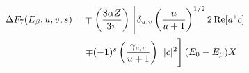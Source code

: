 %
%
%
\begin{align}
\Delta F_7(E_{\beta}, u, v, s) = &
\mp \left( \frac{8 \alpha Z}{3\pi } \right) \left[ \delta_{u,v} \left( \frac{u}{u+1} \right)^{1/2} 2\,\mathrm{Re}\! \,[a^* c] 
\right. \nonumber \\ & \left.
\mp (-1)^s \left( \frac{\gamma_{u,v}}{u+1} \right)^{\phantom{1/2}}\!\!\!\!\! |c|^2 \right] (E_0 - E_{\beta}) X
\label{eq:holstein_DeltaF7_Euvs}
\end{align}
% 
% 
% 
